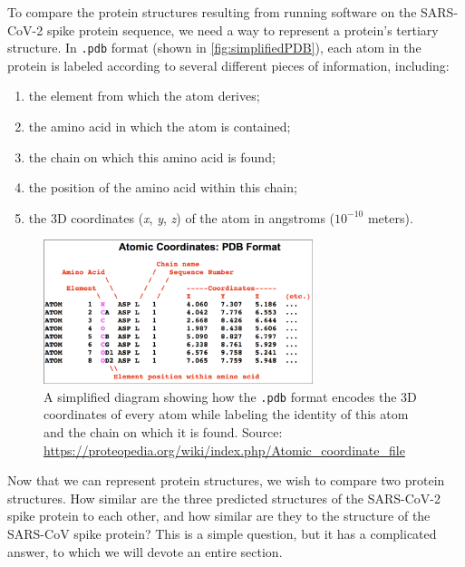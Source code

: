 To compare the protein structures resulting from running software on the SARS-CoV-2 spike protein sequence, we need a way to represent a protein's tertiary structure. In \texttt{.pdb} format (shown in \autoref{fig:simplifiedPDB}), each atom in the protein is labeled according to several different pieces of information, including:

\begin{enumerate}
	\item the element from which the atom derives;
	\item the amino acid in which the atom is contained;
	\item the chain on which this amino acid is found;
	\item the position of the amino acid within this chain;
	\item the 3D coordinates (\textit{x}, \textit{y}, \textit{z}) of the atom in angstroms ($10^{-10}$ meters).
\end{enumerate}

\begin{figure}[h]
	\centering
	\mySfFamily
	\includegraphics[width = 0.7\textwidth]{../images/simplifiedPDB.png}
	\caption{A simplified diagram showing how the \texttt{.pdb} format encodes the 3D coordinates of every atom while labeling the identity of this atom and the chain on which it is found. Source: \url{https://proteopedia.org/wiki/index.php/Atomic_coordinate_file}}
	\label{fig:simplifiedPDB}
\end{figure}

\begin{note}\end{note}

Now that we can represent protein structures, we wish to compare two protein structures. How similar are the three predicted structures of the SARS-CoV-2 spike protein to each other, and how similar are they to the structure of the SARS-CoV spike protein? This is a simple question, but it has a complicated answer, to which we will devote an entire section.\\


